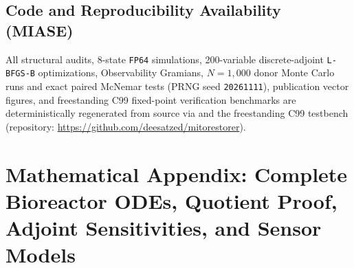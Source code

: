 \documentclass[11pt]{article}
\theoremstyle{plain}
\theoremstyle{remark}
\begin{document}
\subsection{Code and Reproducibility Availability (MIASE)}
All structural audits, 8-state \texttt{FP64} simulations, 200-variable discrete-adjoint \texttt{L-BFGS-B} optimizations, Observability Gramians, $N = 1{,}000$ donor Monte Carlo runs and exact paired McNemar tests (PRNG seed \texttt{20261111}), publication vector figures, and freestanding C99 fixed-point verification benchmarks are deterministically regenerated from source via  and the freestanding C99 testbench  (repository: \url{https://github.com/deesatzed/mitorestorer}).

\appendix
\section{Mathematical Appendix: Complete Bioreactor ODEs, Quotient Proof, Adjoint Sensitivities, and Sensor Models}
\label{app:math}
\setcounter{equation}{0}
\end{document}
